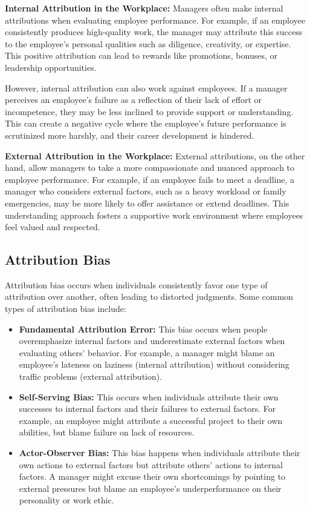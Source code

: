 \documentclass{article}
\begin{document}
\textbf{Internal Attribution in the Workplace:}  
Managers often make internal attributions when evaluating employee performance. For example, if an employee consistently produces high-quality work, the manager may attribute this success to the employee's personal qualities such as diligence, creativity, or expertise. This positive attribution can lead to rewards like promotions, bonuses, or leadership opportunities.

However, internal attribution can also work against employees. If a manager perceives an employee's failure as a reflection of their lack of effort or incompetence, they may be less inclined to provide support or understanding. This can create a negative cycle where the employee's future performance is scrutinized more harshly, and their career development is hindered.

\textbf{External Attribution in the Workplace:}  
External attributions, on the other hand, allow managers to take a more compassionate and nuanced approach to employee performance. For example, if an employee fails to meet a deadline, a manager who considers external factors, such as a heavy workload or family emergencies, may be more likely to offer assistance or extend deadlines. This understanding approach fosters a supportive work environment where employees feel valued and respected.

\subsection*{Attribution Bias}
Attribution bias occurs when individuals consistently favor one type of attribution over another, often leading to distorted judgments. Some common types of attribution bias include:

\begin{itemize}
    \item \textbf{Fundamental Attribution Error:} This bias occurs when people overemphasize internal factors and underestimate external factors when evaluating others' behavior. For example, a manager might blame an employee's lateness on laziness (internal attribution) without considering traffic problems (external attribution).
    \item \textbf{Self-Serving Bias:} This occurs when individuals attribute their own successes to internal factors and their failures to external factors. For example, an employee might attribute a successful project to their own abilities, but blame failure on lack of resources.
    \item \textbf{Actor-Observer Bias:} This bias happens when individuals attribute their own actions to external factors but attribute others' actions to internal factors. A manager might excuse their own shortcomings by pointing to external pressures but blame an employee’s underperformance on their personality or work ethic.
\end{itemize}
\end{document}
